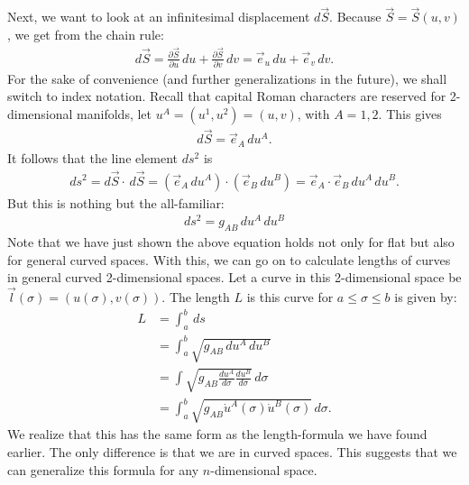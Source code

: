 \documentclass{article}
\theoremstyle{definition}
\begin{document}
Next, we want to look at an infinitesimal displacement $d\vec{S}$. Because $\vec{S} = \vec{S}(u,v)$, we get from the chain rule:
\begin{align*}
d\vec{S} = \frac{\partial \vec{S}}{\partial u}\,du + \frac{\partial\vec{S}}{\partial v}\,dv = \vec{e}_u\,du + \vec{e}_v\,dv.
\end{align*}
For the sake of convenience (and further generalizations in the future), we shall switch to index notation. Recall that capital Roman characters are reserved for 2-dimensional manifolds, let $u^A = (u^1,u^2) = (u,v)$, with $A=1,2$. This gives
\begin{align*}
d\vec{S} = \vec{e}_A\,du^A.
\end{align*}
It follows that the line element $ds^2$ is
\begin{align*}
ds^2 = d\vec{S}\cdot\,d\vec{S} = \left(\vec{e}_A\,du^A \right) \cdot \left( \vec{e}_B\,du^B\right) = \vec{e}_A \cdot \vec{e}_B\,du^A\, du^B.
\end{align*}
But this is nothing but the all-familiar:
\begin{align*}
\boxed{ds^2 = g_{AB}\,du^A\,du^B}
\end{align*}
Note that we have just shown the above equation holds not only for flat but also for general curved spaces. With this, we can go on to calculate lengths of curves in general curved 2-dimensional spaces. Let a curve in this 2-dimensional space be $\vec{l}(\sigma) = (u(\sigma),v(\sigma))$. The length $L$ is this curve for $a \leq \sigma \leq b$ is given by:
\begin{align*}
L &= \int_{a}^{b}\,ds \\
&= \int_{a}^{b}\sqrt{g_{AB}\,du^A\,du^B}\\ 
&= \int\sqrt{g_{AB}\frac{du^A}{d\sigma}\frac{du^B}{d\sigma}}\,d\sigma\\
&= \int_{a}^{b}\sqrt{g_{AB}\dot{u}^{A}(\sigma)\dot{u}^{B}(\sigma)}\,d\sigma.
\end{align*}
We realize that this has the same form as the length-formula we have found earlier. The only difference is that we are in curved spaces. This suggests that we can generalize this formula for any $n$-dimensional space. \\
\end{document}
